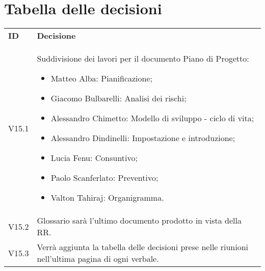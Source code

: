 \documentclass[]{article}
\begin{document}
	\section{Tabella delle decisioni}
	
	\begin{table} [h!]
		\begin{center}
			\begin{tabular} { m{2cm} m{14cm} }
				\rowcolor{lightgray}
				\textbf{ID} & \textbf{Decisione} \\
				V15.1 & Suddivisione dei lavori per il documento Piano di Progetto:
				\begin{itemize}
					\item Matteo Alba: Pianificazione;
					\item Giacomo Bulbarelli: Analisi dei rischi;
					\item Alessandro Chimetto: Modello di sviluppo - ciclo di vita;
					\item Alessandro Dindinelli: Impostazione e introduzione;
					\item Lucia Fenu: Consuntivo;
					\item Paolo Scanferlato: Preventivo;
					\item Valton Tahiraj: Organigramma.
				\end{itemize} \\
				V15.2 & Glossario sarà l'ultimo documento prodotto in vista della RR.\\
				V15.3 & Verrà aggiunta la tabella delle decisioni prese nelle riunioni nell'ultima pagina di ogni verbale.\\
			\end{tabular}

		\end{center}
	\end{table}
	
\end{document}
